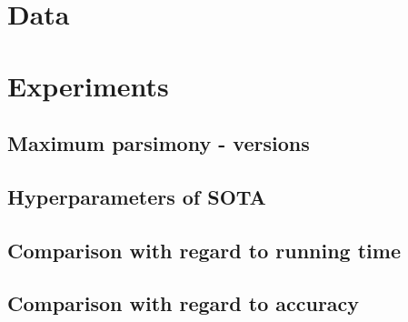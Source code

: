 \documentclass[11pt,twocolumn]{article}
\begin{document}
\section*{Data}

\section*{Experiments}

\subsection*{Maximum parsimony - versions}

\subsection*{Hyperparameters of SOTA}

\subsection*{Comparison with regard to running time}

\subsection*{Comparison with regard to accuracy}


\nocite{*}

\end{document}
